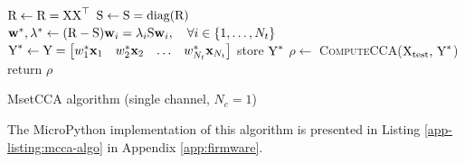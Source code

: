 \begin{algorithm}
\begin{algorithmic}[1]
 
\State ${\textrm{R}} \gets {\textrm{R}} = {\textrm{X}}{\textrm{X}}^\top$ 
\State ${\textrm{S}} \gets {\textrm{S}} = \textrm{diag}({\textrm{R}})$ 
\State ${\mathbf{w}}^*, \lambda^* \gets ({\textrm{R}}-{\textrm{S}}){\mathbf{w}}_{i}=\lambda_{i} {\textrm{S}} {\mathbf{w}}_{i}, \quad \forall i \in\{1, \ldots, N_t\}$ 
\State ${\textrm{Y}}^* \gets {\textrm{Y}} = \begin{bmatrix}w^*_1 {\mathbf{x}}_1 & w^*_2 {\mathbf{x}}_2 & \dots & w^*_{N_t} {\mathbf{x}}_{N_t} \end{bmatrix}$ 
\State store ${\textrm{Y}}^*$
\EndFunction
\vspace{0.3cm}
 
\State $\rho \gets $ \textsc{ComputeCCA}(${\textrm{X}}_{\textrm{test}}, \, {\textrm{Y}}^*$) 
\State return $\rho$
\EndFunction
\end{algorithmic}
\caption{MsetCCA algorithm (single channel, $N_c=1$)}
\label{alg:mset-cca}
\end{algorithm}

The MicroPython implementation of this algorithm is presented in Listing \ref{app-listing:mcca-algo} in Appendix \ref{app:firmware}.



